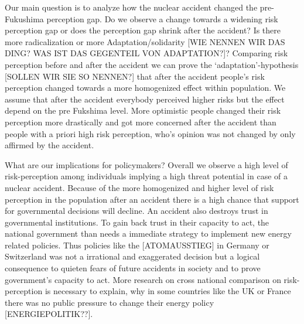 {Our main question is to analyze how the nuclear accident changed the pre-Fukushima perception gap. Do we observe a change towards a widening risk perception gap or does the perception gap shrink after the accident? Is there more radicalization or more Adaptation/solidarity [WIE NENNEN WIR DAS DING? WAS IST DAS GEGENTEIL VON ADAPTATION?]? Comparing risk perception before and after the accident we can prove the `adaptation'-hypothesis [SOLLEN WIR SIE SO NENNEN?] that after the accident people's risk perception changed towards a more homogenized effect within population. We assume that after the accident everybody perceived higher risks but the effect depend on the pre Fukshima level. More optimistic  people changed their risk perception more drastically and got more concerned after the accident  than people with a priori high risk perception, who's opinion was not changed by only affirmed by the accident. 



What are our implications for policymakers? Overall we observe a high level of risk-perception among individuals implying a high threat potential in case of a nuclear accident. Because of the more homogenized and higher level of risk perception in the population after an accident there is a high chance that support for governmental decisions will decline. An accident also destroys trust in governmental institutions. To gain back  trust in their capacity to act, the national government than needs a immediate strategy to implement new energy related policies. Thus policies like the [ATOMAUSSTIEG] in Germany or Switzerland was not a irrational and exaggerated decision but a logical consequence to quieten fears of future accidents in society and to prove government's capacity to act. More research on cross national comparison on risk-perception is necessary to explain, why in some countries like the UK or France there was no public pressure to change their energy policy [ENERGIEPOLITIK??].



}
